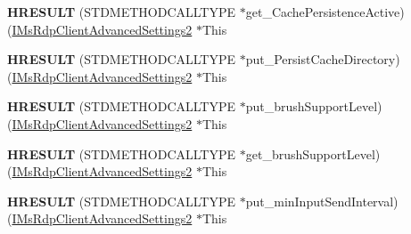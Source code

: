 \begin{DoxyCompactItemize}
\item 
\mbox{\label{struct_m_s_t_s_c_lib_1_1_i_ms_rdp_client_advanced_settings2_vtbl_adb1cdca6f25515ef030b7f4d4c225b74}} 
{\bfseries H\+R\+E\+S\+U\+LT} (S\+T\+D\+M\+E\+T\+H\+O\+D\+C\+A\+L\+L\+T\+Y\+PE $\ast$get\+\_\+\+Cache\+Persistence\+Active)(\hyperlink{interface_m_s_t_s_c_lib_1_1_i_ms_rdp_client_advanced_settings2}{I\+Ms\+Rdp\+Client\+Advanced\+Settings2} $\ast$This
\item 
\mbox{\label{struct_m_s_t_s_c_lib_1_1_i_ms_rdp_client_advanced_settings2_vtbl_ad0c2ccba4754648aa175bde792ddd6d5}} 
{\bfseries H\+R\+E\+S\+U\+LT} (S\+T\+D\+M\+E\+T\+H\+O\+D\+C\+A\+L\+L\+T\+Y\+PE $\ast$put\+\_\+\+Persist\+Cache\+Directory)(\hyperlink{interface_m_s_t_s_c_lib_1_1_i_ms_rdp_client_advanced_settings2}{I\+Ms\+Rdp\+Client\+Advanced\+Settings2} $\ast$This
\item 
\mbox{\label{struct_m_s_t_s_c_lib_1_1_i_ms_rdp_client_advanced_settings2_vtbl_a28d3652fa6e7d8607c2643c5542609ba}} 
{\bfseries H\+R\+E\+S\+U\+LT} (S\+T\+D\+M\+E\+T\+H\+O\+D\+C\+A\+L\+L\+T\+Y\+PE $\ast$put\+\_\+brush\+Support\+Level)(\hyperlink{interface_m_s_t_s_c_lib_1_1_i_ms_rdp_client_advanced_settings2}{I\+Ms\+Rdp\+Client\+Advanced\+Settings2} $\ast$This
\item 
\mbox{\label{struct_m_s_t_s_c_lib_1_1_i_ms_rdp_client_advanced_settings2_vtbl_a82b789c29c3d574125b6203af441b3c4}} 
{\bfseries H\+R\+E\+S\+U\+LT} (S\+T\+D\+M\+E\+T\+H\+O\+D\+C\+A\+L\+L\+T\+Y\+PE $\ast$get\+\_\+brush\+Support\+Level)(\hyperlink{interface_m_s_t_s_c_lib_1_1_i_ms_rdp_client_advanced_settings2}{I\+Ms\+Rdp\+Client\+Advanced\+Settings2} $\ast$This
\item 
\mbox{\label{struct_m_s_t_s_c_lib_1_1_i_ms_rdp_client_advanced_settings2_vtbl_adf0ab6be295f42226abf9afd1f2331aa}} 
{\bfseries H\+R\+E\+S\+U\+LT} (S\+T\+D\+M\+E\+T\+H\+O\+D\+C\+A\+L\+L\+T\+Y\+PE $\ast$put\+\_\+min\+Input\+Send\+Interval)(\hyperlink{interface_m_s_t_s_c_lib_1_1_i_ms_rdp_client_advanced_settings2}{I\+Ms\+Rdp\+Client\+Advanced\+Settings2} $\ast$This

\end{DoxyCompactItemize}
